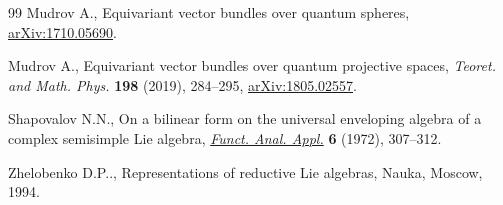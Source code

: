 \documentclass[pdftex]{sigma}
\numberwithin{equation}{section}
\begin{document}
\begin{thebibliography}{99}
Mudrov A., Equivariant vector bundles over quantum spheres,
 \href{https://arxiv.org/abs/1710.05690}{arXiv:1710.05690}.

Mudrov A., Equivariant vector bundles over quantum projective spaces,
 \textit{Teoret. and Math. Phys.} \textbf{198} (2019), 284--295,
 \href{https://arxiv.org/abs/1805.02557}{arXiv:1805.02557}.

Shapovalov N.N., On a bilinear form on the universal enveloping algebra of a
 complex semisimple {L}ie algebra, \href{https://doi.org/10.1007/BF01077650}{\textit{Funct. Anal. Appl.}} \textbf{6}
 (1972), 307--312.

Zhelobenko D.P.., Representations of reductive {L}ie algebras, Nauka, Moscow,
 1994.

\end{thebibliography}\LastPageEnding
\end{document}
